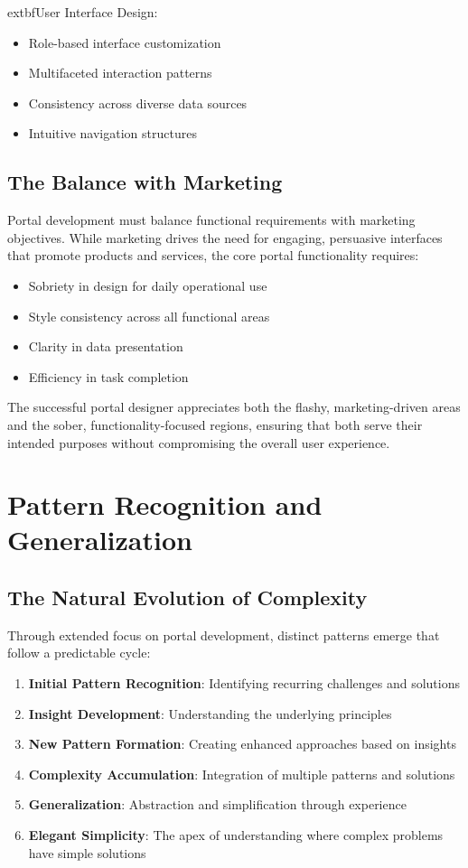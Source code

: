 	extbf{User Interface Design:}
\begin{itemize}
\item Role-based interface customization
\item Multifaceted interaction patterns
\item Consistency across diverse data sources
\item Intuitive navigation structures
\end{itemize}

\subsection{The Balance with Marketing}

Portal development must balance functional requirements with marketing objectives. While marketing drives the need for engaging, persuasive interfaces that promote products and services, the core portal functionality requires:

\begin{itemize}
\item Sobriety in design for daily operational use
\item Style consistency across all functional areas
\item Clarity in data presentation
\item Efficiency in task completion
\end{itemize}

The successful portal designer appreciates both the flashy, marketing-driven areas and the sober, functionality-focused regions, ensuring that both serve their intended purposes without compromising the overall user experience.

\section{Pattern Recognition and Generalization}

\subsection{The Natural Evolution of Complexity}

Through extended focus on portal development, distinct patterns emerge that follow a predictable cycle:

\begin{enumerate}
\item \textbf{Initial Pattern Recognition}: Identifying recurring challenges and solutions
\item \textbf{Insight Development}: Understanding the underlying principles
\item \textbf{New Pattern Formation}: Creating enhanced approaches based on insights
\item \textbf{Complexity Accumulation}: Integration of multiple patterns and solutions
\item \textbf{Generalization}: Abstraction and simplification through experience
\item \textbf{Elegant Simplicity}: The apex of understanding where complex problems have simple solutions
\end{enumerate}


